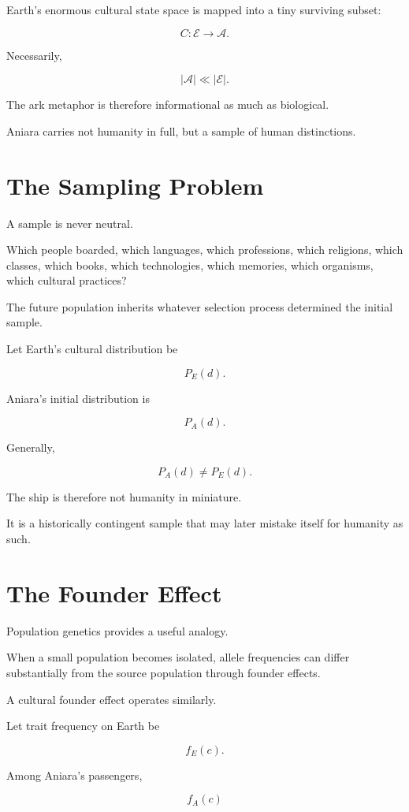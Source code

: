 \documentclass[11pt,oneside]{book}
\theoremstyle{definition}
\theoremstyle{remark}
\begin{document}
Earth's enormous cultural state space is mapped into a tiny surviving subset:

\[
C:
\mathcal E
\rightarrow
\mathcal A.
\]

Necessarily,

\[
|\mathcal A|
\ll
|\mathcal E|.
\]

The ark metaphor is therefore informational as much as biological.

Aniara carries not humanity in full, but a sample of human distinctions.

\section{The Sampling Problem}

A sample is never neutral.

Which people boarded, which languages, which professions, which religions, which classes, which books, which technologies, which memories, which organisms, which cultural practices?

The future population inherits whatever selection process determined the initial sample.

Let Earth's cultural distribution be

\[
P_E(d).
\]

Aniara's initial distribution is

\[
P_A(d).
\]

Generally,

\[
P_A(d)\neq P_E(d).
\]

The ship is therefore not humanity in miniature.

It is a historically contingent sample that may later mistake itself for humanity as such.

\section{The Founder Effect}

Population genetics provides a useful analogy.

When a small population becomes isolated, allele frequencies can differ substantially from the source population through founder effects.

A cultural founder effect operates similarly.

Let trait frequency on Earth be

\[
f_E(c).
\]

Among Aniara's passengers,

\[
f_A(c)
\]
\end{document}

